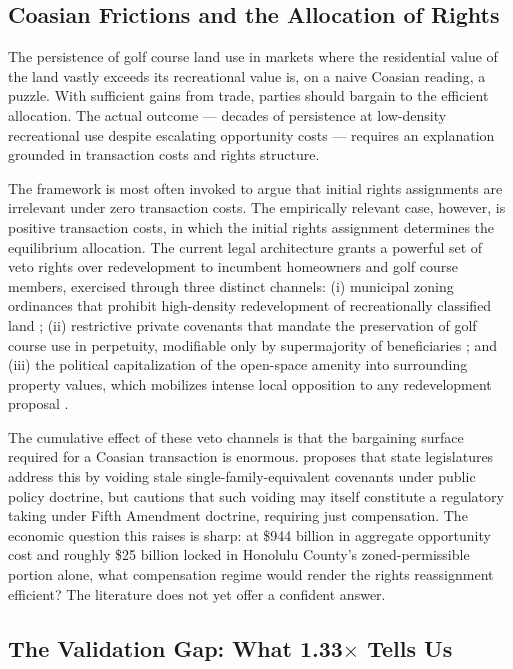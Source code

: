 \documentclass[11pt, letterpaper]{article}
\begin{document}
\subsection{Coasian Frictions and the Allocation of Rights}

The persistence of golf course land use in markets where the residential value of the land vastly exceeds its recreational value is, on a naive Coasian reading, a puzzle. With sufficient gains from trade, parties should bargain to the efficient allocation. The actual outcome --- decades of persistence at low-density recreational use despite escalating opportunity costs --- requires an explanation grounded in transaction costs and rights structure.

The \textcite{Coase1960} framework is most often invoked to argue that initial rights assignments are irrelevant under zero transaction costs. The empirically relevant case, however, is positive transaction costs, in which the initial rights assignment determines the equilibrium allocation. The current legal architecture grants a powerful set of veto rights over redevelopment to incumbent homeowners and golf course members, exercised through three distinct channels: (i) municipal zoning ordinances that prohibit high-density redevelopment of recreationally classified land \parencite{Fischel2015}; (ii) restrictive private covenants that mandate the preservation of golf course use in perpetuity, modifiable only by supermajority of beneficiaries \parencite{Ellickson2022}; and (iii) the political capitalization of the open-space amenity into surrounding property values, which mobilizes intense local opposition to any redevelopment proposal \parencite{Cheshire2002}.

The cumulative effect of these veto channels is that the bargaining surface required for a Coasian transaction is enormous. \textcite{Korngold2024} proposes that state legislatures address this by voiding stale single-family-equivalent covenants under public policy doctrine, but cautions that such voiding may itself constitute a regulatory taking under Fifth Amendment doctrine, requiring just compensation. The economic question this raises is sharp: at \$944 billion in aggregate opportunity cost and roughly \$25 billion locked in Honolulu County's zoned-permissible portion alone, what compensation regime would render the rights reassignment efficient? The literature does not yet offer a confident answer.

\subsection{The Validation Gap: What 1.33\texorpdfstring{$\times$}{x} Tells Us}
\end{document}
